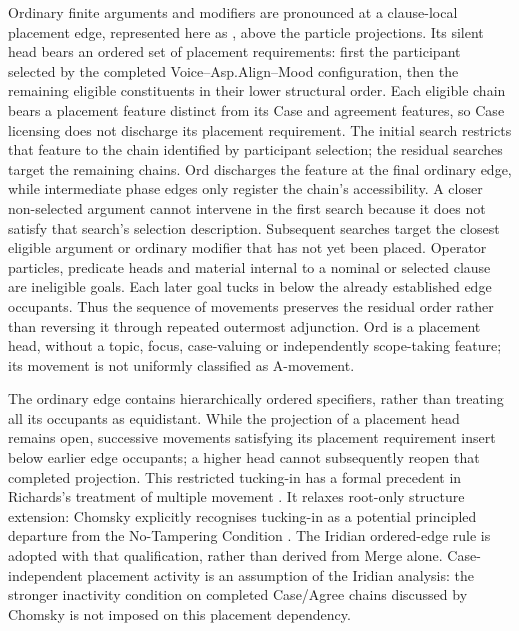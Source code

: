 Ordinary finite arguments and modifiers are pronounced at a clause-local
 placement edge, represented here as , above the particle
 projections. Its silent head bears an ordered set of placement requirements:
 first the participant selected by the completed Voice--Asp.Align--Mood
 configuration, then the remaining eligible constituents in their lower
 structural order. Each eligible chain bears a placement feature distinct
 from its Case and agreement features, so Case licensing does not discharge
 its placement requirement. The initial search restricts that feature to the
 chain identified by participant selection; the residual searches target
 the remaining chains. Ord discharges the feature at the final ordinary
 edge, while intermediate phase edges only register the chain's accessibility.
 A closer non-selected argument cannot intervene in the first search because
 it does not satisfy that search's selection description. Subsequent searches
 target the closest eligible argument or ordinary modifier that has not yet
 been placed. Operator particles, predicate heads and material internal to
 a nominal or selected clause are ineligible goals. Each later goal tucks
 in below the already established edge occupants. Thus the sequence of
 movements preserves the residual order rather than reversing it through
 repeated outermost adjunction. Ord is a placement head, without a topic,
 focus, case-valuing or independently scope-taking feature; its movement is
 not uniformly classified as A-movement.

The ordinary edge contains hierarchically ordered specifiers, rather than
 treating all its occupants as equidistant. While the projection of a placement
 head remains open, successive movements satisfying its placement requirement
 insert below earlier edge occupants; a higher head cannot subsequently reopen
 that completed projection. This restricted tucking-in has a formal precedent
 in Richards's treatment of multiple movement \cite[§2]{richards2002}.
 It relaxes root-only structure extension: Chomsky explicitly recognises
 tucking-in as a potential principled departure from the No-Tampering
 Condition \cite[p.~141]{chomsky2008}. The Iridian ordered-edge rule is
 adopted with that qualification, rather than derived from Merge alone.
 Case-independent placement activity is an assumption of the Iridian
 analysis: the stronger inactivity condition on completed Case/Agree chains
 discussed by Chomsky \cite[pp.~150--151]{chomsky2008} is not imposed on
 this placement dependency.

